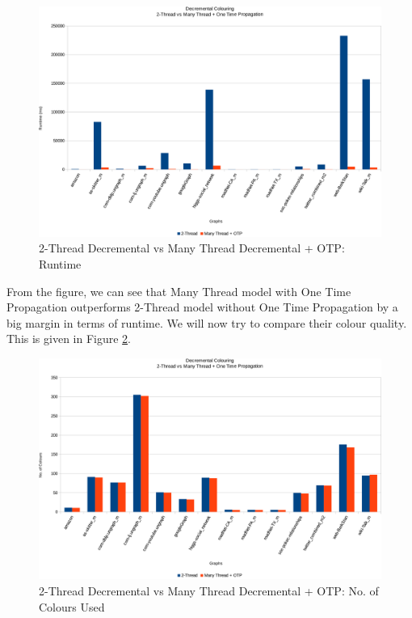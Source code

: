 \documentclass[MTech]{iitmdiss}
\begin{document}
\begin{figure}[h]
    \centering
    \includegraphics[width=\textwidth,keepaspectratio=true]{chartNewest17.pdf}
    \caption{
        2-Thread Decremental vs Many Thread Decremental + OTP: Runtime
    }
    \label{fig:chart26}
\end{figure}

From the figure, we can see that Many Thread model with One Time Propagation outperforms 2-Thread model without One Time Propagation by a big margin in terms of runtime. We will now try to compare their colour quality. This is given in Figure \ref{fig:chart27}. 

\begin{figure}[h]
    \centering
    \includegraphics[width=\textwidth,keepaspectratio=true]{chartNewest27.pdf}
    \caption{
        2-Thread Decremental vs Many Thread Decremental + OTP: No. of Colours Used
    }
    \label{fig:chart27}
\end{figure}
\end{document}
